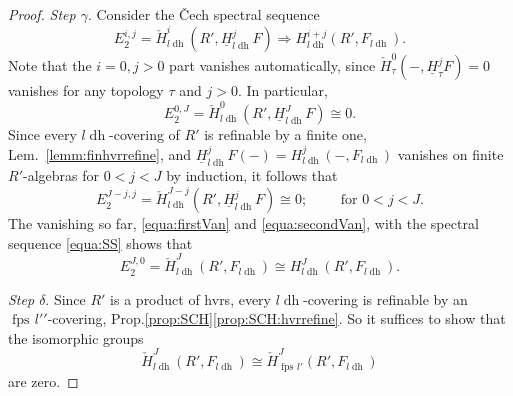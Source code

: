 \documentclass[10pt]{amsart}
\renewcommand{\implies}{\Rightarrow}
\theoremstyle{definition}
\newcommand{\p}{\mathfrak{p}}
\DeclareMathOperator{\Spec}{Spec}
\newcommand{\ulh}{\underline{H}}
\newcommand{\fpsl}{{\operatorname{fps\!}l'}}
\newcommand{\ldh}{{l{\operatorname{dh}}}}
\newcommand{\uh}{\operatorname{uh}}
\newcommand{\red}{{\operatorname{red}}}
\newcommand{\pic}{{\operatorname{pic}}}
\begin{document}
\begin{proof}
\emph{Step $\gamma$}. Consider the \v{C}ech spectral sequence 
\begin{equation} \label{equa:SS}
E_2^{i,j} = \check{H}^i_\ldh(R', \ulh_\ldh^jF) \implies H^{i+j}_\ldh(R', F_\ldh). 
\end{equation}
Note that the $i = 0, j > 0$ part vanishes automatically, since $\check{H}^0_\tau(-, \ulh_\tau^jF) = 0$ vanishes for any topology $\tau$ and $j > 0$. In particular, 
\begin{equation} \label{equa:firstVan}
E_2^{0, J} = \check{H}^0_\ldh(R', \ulh_\ldh^JF) \cong 0.
\end{equation}
%
Since every $\ldh$-covering of $R'$ is refinable by a finite one, Lem.~\ref{lemm:finhvrrefine}, and $\underline{H}_\ldh^jF(-) = H_\ldh^j(-, F_\ldh)$ vanishes on finite $R'$-algebras for $0 < j < J$ by induction, it follows that
\begin{equation} \label{equa:secondVan}
E_2^{J-j,j} = \check{H}^{J-j}_\ldh(R', \ulh_\ldh^jF) \cong 0; \qquad \textrm{  for } 0 < j < J. 
\end{equation}
%
The vanishing so far, \eqref{equa:firstVan} and \eqref{equa:secondVan}, with the spectral sequence \eqref{equa:SS} shows that
\begin{equation} \label{equa:checkCoh}
E_2^{J, 0} = \check{H}_\ldh^J(R', F_\ldh) \cong H_\ldh^J(R', F_\ldh).
\end{equation}

\emph{Step $\delta$}. Since $R'$ is a product of hvrs, every $\ldh$-covering is refinable by an $\fpsl'$-covering, Prop.\ref{prop:SCH}\eqref{prop:SCH:hvrrefine}. So it suffices to show that the isomorphic groups
\begin{equation} \label{equa:ldhFpsl}
\check{H}_\ldh^J(R', F_\ldh) \cong \check{H}_\fpsl^J(R', F_\ldh)
\end{equation}
are zero.


\end{proof}
\end{document}
